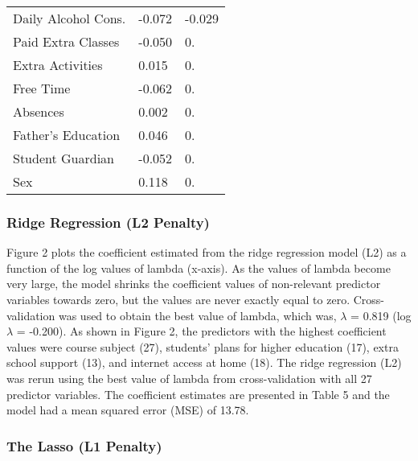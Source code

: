 \documentclass[sigconf]{acmart}
\begin{document}
\begin{table}
\begin{tabular}{lll}
    Daily Alcohol Cons. &   -0.072      &   -0.029   \\ 
    Paid Extra Classes  &   -0.050      &    0.   \\      
    Extra Activities    &    0.015      &    0.   \\    
    Free Time           &   -0.062      &    0.   \\    
    Absences            &    0.002      &    0.   \\
    Father's Education  &    0.046      &    0.   \\         
    Student Guardian    &   -0.052      &    0.   \\    
    Sex                 &    0.118      &    0.   \\
    \bottomrule
  \end{tabular}
\end{table}


\subsubsection{Ridge Regression (L2 Penalty)}

Figure 2 plots the coefficient estimated from the ridge regression model (L2) 
as a function of the log values of lambda (x-axis). As the values of lambda 
become very large, the model shrinks the coefficient values of non-relevant 
predictor variables towards zero, but the values are never exactly equal to 
zero. Cross-validation was used to obtain the best value of lambda, which 
was, $\lambda$ = 0.819 (log$\lambda$  = -0.200). As shown in Figure 2, the 
predictors with the highest coefficient values were course subject (27), 
students' plans for higher education (17), extra school support (13), and 
internet access at home (18). The ridge regression (L2) was rerun using the
best value of lambda from cross-validation with all 27 predictor variables. 
The coefficient estimates are presented in Table 5 and the model had a mean 
squared error (MSE) of 13.78. 


\subsubsection{The Lasso (L1 Penalty)}
\end{document}

